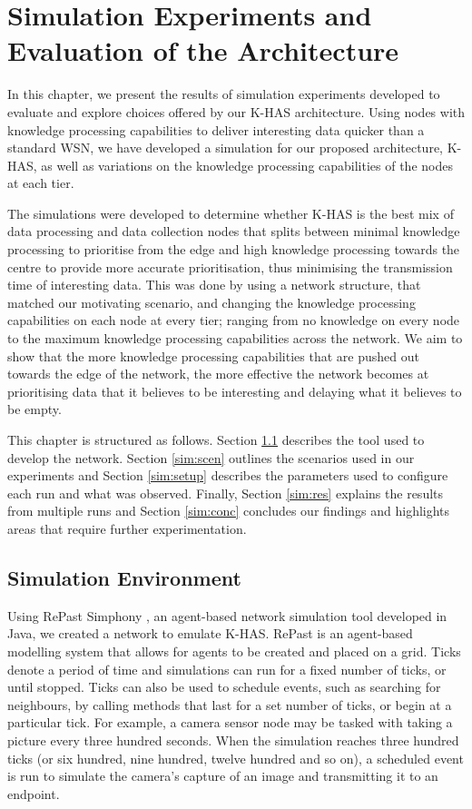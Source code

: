 \chapter{Simulation Experiments and Evaluation of the Architecture}
In this chapter, we present the results of simulation experiments developed to evaluate and explore choices offered by our K-HAS architecture. Using nodes with knowledge processing capabilities to deliver interesting data quicker than a standard WSN, we have developed a simulation for our proposed architecture, K-HAS, as well as variations on the knowledge processing capabilities of the nodes at each tier.

The simulations were developed to determine whether K-HAS is the best mix of data processing and data collection nodes that splits between minimal knowledge processing to prioritise from the edge and high knowledge processing towards the centre to provide more accurate prioritisation, thus minimising the transmission time of interesting data. This was done by using a network structure, that matched our motivating scenario, and changing the knowledge processing capabilities on each node at every tier; ranging from no knowledge on every node to the maximum knowledge processing capabilities across the network. We aim to show that the more knowledge processing capabilities that are pushed out towards the edge of the network, the more effective the network becomes at prioritising data that it believes to be interesting and delaying what it believes to be empty.

This chapter is structured as follows. Section \ref{sim:env} describes the tool used to develop the network. Section \ref{sim:scen} outlines the scenarios used in our experiments and Section \ref{sim:setup} describes the parameters used to configure each run and what was observed. Finally, Section \ref{sim:res} explains the results from multiple runs and Section \ref{sim:conc} concludes our findings and highlights areas that require further experimentation.

\section{Simulation Environment}\label{sim:env}
Using RePast Simphony \cite{Collier2003}, an agent-based network simulation tool developed in Java, we created a network to emulate K-HAS. RePast is an agent-based modelling system that allows for agents to be created and placed on a grid. Ticks denote a period of time and simulations can run for a fixed number of ticks, or until stopped. Ticks can also be used to schedule events, such as searching for neighbours, by calling methods that last for a set number of ticks, or begin at a particular tick. For example, a camera sensor node may be tasked with taking a picture every three hundred seconds. When the simulation reaches three hundred ticks (or six hundred, nine hundred, twelve hundred and so on), a scheduled event is run to simulate the camera's capture of an image and transmitting it to an endpoint.

